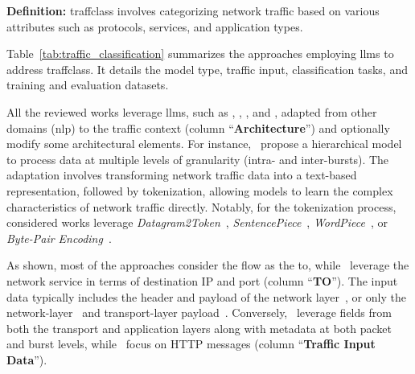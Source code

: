 
%

 


%
\noindent
\textbf{Definition:} \gls{traffclass} involves categorizing network traffic based on various attributes such as protocols, services, and application types.

Table~\ref{tab:traffic_classification} summarizes the approaches employing \glspl{llm} to address \gls{traffclass}. 
It details the model type, traffic input, classification tasks, and training and evaluation datasets.

All the reviewed works leverage \glspl{llm}, such as , , , and ,
adapted from other domains (\eg \gls{nlp}) to the traffic context (column ``\textbf{Architecture}'') and optionally modify some architectural elements.
For instance,~\cite{guthula2023netfound} propose a hierarchical  model to process data at multiple levels of granularity (\eg intra- and inter-bursts).
The adaptation involves transforming network traffic data into a text-based representation, followed by tokenization, allowing models to learn the complex characteristics of network traffic directly.
Notably, for the tokenization process, considered works leverage \emph{Datagram2Token}~\cite{lin2022, guthula2023netfound, wang2024netmamba, tao2024lambert}, \emph{SentencePiece}~\cite{meng2023netgpt, wang2024lens, qu2024trafficgpt}, \emph{WordPiece}~\cite{wang2024lens}, or \emph{Byte-Pair Encoding}~\cite{sarabi2023}.

As shown, most of the approaches consider the flow as the \gls{to}, 
while~\citet{sarabi2023} leverage 
the network service in terms of destination IP and port (column ``\textbf{TO}'').
The input data typically includes the header and payload of the network layer~\cite{meng2023netgpt, wang2024lens, qu2024trafficgpt, wang2024netmamba,li2024albert}, or only the network-layer~\cite{lin2022} and transport-layer payload~\cite{tao2024lambert}.
Conversely,~\citet{guthula2023netfound} leverage fields from both the transport and application layers along with metadata at both packet and burst levels, while~\cite{sarabi2023} focus on HTTP messages (column ``\textbf{Traffic Input Data}'').

